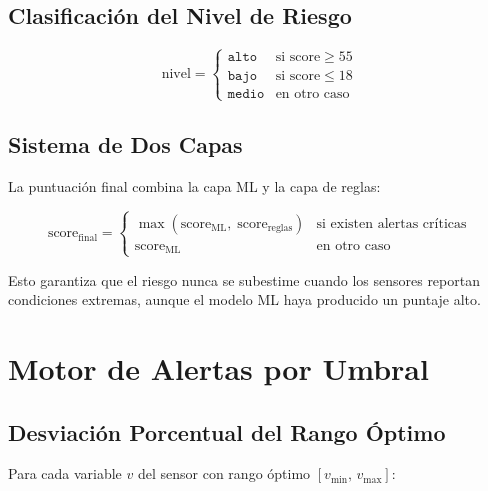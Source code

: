 \documentclass[12pt, a4paper]{article}
\begin{document}
\subsection{Clasificación del Nivel de Riesgo}

\begin{equation}
  \text{nivel} =
  \begin{cases}
    \texttt{alto}   & \text{si score} \geq 55 \\
    \texttt{bajo}   & \text{si score} \leq 18 \\
    \texttt{medio}  & \text{en otro caso}
  \end{cases}
  \label{eq:nivel_riesgo}
\end{equation}

\subsection{Sistema de Dos Capas}

La puntuación final combina la capa ML y la capa de reglas:

\begin{equation}
  \text{score}_{\text{final}} =
  \begin{cases}
    \max\!\left(\text{score}_{\text{ML}},\; \text{score}_{\text{reglas}}\right) & \text{si existen alertas críticas} \\
    \text{score}_{\text{ML}} & \text{en otro caso}
  \end{cases}
  \label{eq:dos_capas}
\end{equation}

Esto garantiza que el riesgo nunca se subestime cuando los sensores reportan condiciones extremas, aunque el modelo ML haya producido un puntaje alto.

\section{Motor de Alertas por Umbral}

\subsection{Desviación Porcentual del Rango Óptimo}

Para cada variable $v$ del sensor con rango óptimo $[v_{\min},\, v_{\max}]$:
\end{document}
